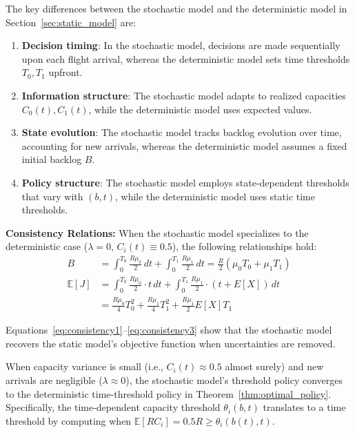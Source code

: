 \documentclass[opre,sglanonrev]{informs4}
\begin{document}
{\color{brown}
The key differences between the stochastic model and the deterministic model in Section~\ref{sec:static_model} are:

\begin{enumerate}
    \item \textbf{Decision timing}: In the stochastic model, decisions are made sequentially upon each flight arrival, whereas the deterministic model sets time thresholds \( T_0, T_1 \) upfront.
    
    \item \textbf{Information structure}: The stochastic model adapts to realized capacities \( C_0(t), C_1(t) \), while the deterministic model uses expected values.
    
    \item \textbf{State evolution}: The stochastic model tracks backlog evolution over time, accounting for new arrivals, whereas the deterministic model assumes a fixed initial backlog \( B \).
    
    \item \textbf{Policy structure}: The stochastic model employs state-dependent thresholds that vary with \( (b, t) \), while the deterministic model uses static time thresholds.
\end{enumerate}

\textbf{Consistency Relations:}
When the stochastic model specializes to the deterministic case (\( \lambda = 0 \), \( C_i(t) \equiv 0.5 \)), the following relationships hold:
\begin{align}
B &= \int_0^{T_0} \frac{R \mu_0}{2} \, dt + \int_0^{T_1} \frac{R \mu_1}{2} \, dt = \frac{R}{2}(\mu_0 T_0 + \mu_1 T_1) \label{eq:consistency1} \\
\mathbb{E}[J] &= \int_0^{T_0} \frac{R \mu_0}{2} \cdot t \, dt + \int_0^{T_1} \frac{R \mu_1}{2} \cdot (t + E[X]) \, dt \label{eq:consistency2} \\
&= \frac{R \mu_0}{4} T_0^2 + \frac{R \mu_1}{4} T_1^2 + \frac{R \mu_1}{2} E[X] T_1 \label{eq:consistency3}
\end{align}

Equations~\eqref{eq:consistency1}--\eqref{eq:consistency3} show that the stochastic model recovers the static model's objective function when uncertainties are removed.

\begin{remark}
When capacity variance is small (i.e., \( C_i(t) \approx 0.5 \) almost surely) and new arrivals are negligible (\( \lambda \approx 0 \)), the stochastic model's threshold policy converges to the deterministic time-threshold policy in Theorem~\ref{thm:optimal_policy}. Specifically, the time-dependent capacity threshold \( \theta_i(b, t) \) translates to a time threshold by computing when \( \mathbb{E}[R C_i] = 0.5R \geq \theta_i(b(t), t) \).
\end{remark}
}
\end{document}
